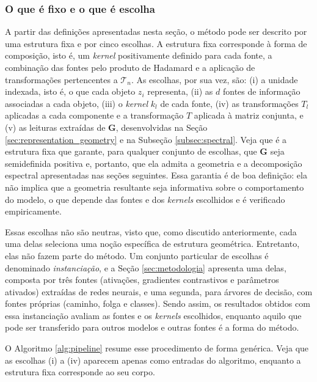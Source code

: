 \subsubsection*{O que é fixo e o que é escolha}

A partir das definições apresentadas nesta seção, o método pode ser descrito por uma estrutura fixa e por cinco escolhas. A estrutura fixa corresponde à forma de composição, isto é, um \textit{kernel} positivamente definido para cada fonte, a combinação das fontes pelo produto de Hadamard e a aplicação de transformações pertencentes a $\mathcal{T}_n$. As escolhas, por sua vez, são: (i) a unidade indexada, isto é, o que cada objeto $z_i$ representa, (ii) as $d$ fontes de informação associadas a cada objeto, (iii) o \textit{kernel} $k_l$ de cada fonte, (iv) as transformações $T_l$ aplicadas a cada componente e a transformação $T$ aplicada à matriz conjunta, e (v) as leituras extraídas de $\mathbf{G}$, desenvolvidas na Seção \ref{sec:representation_geometry} e na Subseção \ref{subsec:spectral}. Veja que é a estrutura fixa que garante, para qualquer conjunto de escolhas, que $\mathbf{G}$ seja semidefinida positiva e, portanto, que ela admita a geometria e a decomposição espectral apresentadas nas seções seguintes. Essa garantia é de boa definição: ela não implica que a geometria resultante seja informativa sobre o comportamento do modelo, o que depende das fontes e dos \textit{kernels} escolhidos e é verificado empiricamente.

Essas escolhas não são neutras, visto que, como discutido anteriormente, cada uma delas seleciona uma noção específica de estrutura geométrica. Entretanto, elas não fazem parte do método. Um conjunto particular de escolhas é denominado \emph{instanciação}, e a Seção \ref{sec:metodologia} apresenta uma delas, composta por três fontes (ativações, gradientes contrastivos e parâmetros ativados) extraídas de redes neurais, e uma segunda, para árvores de decisão, com fontes próprias (caminho, folga e classes). Sendo assim, os resultados obtidos com essa instanciação avaliam as fontes e os \textit{kernels} escolhidos, enquanto aquilo que pode ser transferido para outros modelos e outras fontes é a forma do método.

O Algoritmo \ref{alg:pipeline} resume esse procedimento de forma genérica. Veja que as escolhas (i) a (iv) aparecem apenas como entradas do algoritmo, enquanto a estrutura fixa corresponde ao seu corpo.

